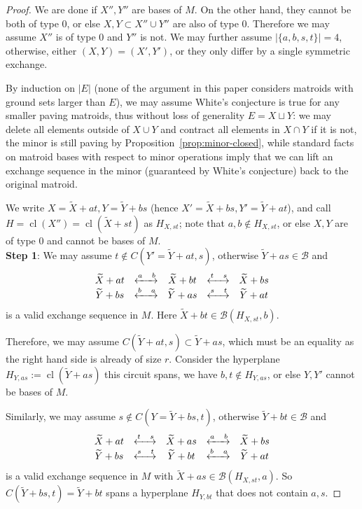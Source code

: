 \documentclass[10pt,a4paper]{amsart}
\DeclareMathOperator{\cl}{cl}
\newcommand\Bcal{{\mathcal B}}
\newcommand{\swap}[2]{\xleftrightarrow{#1 \quad #2}}
\begin{document}
\begin{proof}
    We are done if $X'',Y''$ are bases of $M$. On the other hand, they cannot be both of type 0, or else $X,Y\subset X''\cup Y''$ are also of type 0. Therefore we may assume $X''$ is of type 0 and $Y''$ is not. We may further assume $|\{a,b,s,t\}|=4$, otherwise, either $(X,Y)=(X',Y')$, or they only differ by a single symmetric exchange.
    
    By induction on $|E|$ (none of the argument in this paper considers matroids with ground sets larger than $E$), we may assume White's conjecture is true for any smaller paving matroids, thus without loss of generality $E=X\sqcup Y$: we may delete all elements outside of $X\cup Y$ and contract all elements in $X\cap Y$ if it is not, the minor is still paving by Proposition~\ref{prop:minor-closed}, while standard facts on matroid bases with respect to minor operations imply that we can lift an exchange sequence in the minor (guaranteed by White's conjecture) back to the original matroid.

    We write $X=\widetilde{X}+at, Y=\widetilde{Y}+bs$ (hence $X'=\widetilde{X}+bs,Y'=\widetilde{Y}+at$), and call $H=\cl(X'')=\cl(\tilde{X}+st)$ as $H_{X,st}$; note that $a,b\not\in H_{X,st}$, or else $X,Y$ are of type 0 and cannot be bases of $M$.\\
    
    {\bf Step 1}: We may assume $t\not\in C(Y'=\widetilde{Y}+at,s)$, otherwise $\widetilde{Y}+as\in\Bcal$ and
    $$
    \begin{array}{c c c c c}
        \widetilde{X}+at   & \swap{a}{b} & \widetilde{X}+bt & \swap{t}{s} & \widetilde{X}+bs\\
        \widetilde{Y}+bs   & \swap{b}{a} & \widetilde{Y}+as & \swap{s}{t} & \widetilde{Y}+at
    \end{array}
    $$
    is a valid exchange sequence in $M$. Here $\widetilde{X}+bt\in\Bcal(H_{X,st}, b)$.

    Therefore, we may assume $C(\widetilde{Y}+at,s)\subset\widetilde{Y}+as$, which must be an equality as the right hand side is already of size $r$. Consider the hyperplane $H_{Y,as}:=\cl(\widetilde{Y}+as)$ this circuit spans, we have $b,t\not\in H_{Y,as}$, or else $Y,Y'$ cannot be bases of $M$.
    
    Similarly, we may assume $s\not\in C(Y=\widetilde{Y}+bs,t)$, otherwise $\widetilde{Y}+bt\in\Bcal$ and
    $$
    \begin{array}{c c c c c}
        \widetilde{X}+at   & \swap{t}{s} & \widetilde{X}+as & \swap{a}{b} & \widetilde{X}+bs\\
        \widetilde{Y}+bs   & \swap{s}{t} & \widetilde{Y}+bt & \swap{b}{a} & \widetilde{Y}+at
    \end{array}
    $$
    is a valid exchange sequence in $M$ with $\widetilde{X}+as\in\Bcal(H_{X,st}, a)$. So $C(\widetilde{Y}+bs,t)=\widetilde{Y}+bt$ spans a hyperplane $H_{Y,bt}$ that does not contain $a,s$.


\end{proof}
\end{document}

